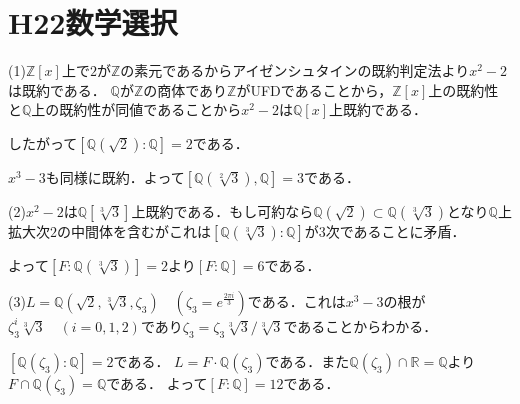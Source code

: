 \documentclass[
		book,
		head_space=20mm,
		foot_space=20mm,
		gutter=10mm,
		line_length=190mm
]{jlreq}
\begin{document}
\section{H22数学選択}
(1)$\mathbb{Z}[x]$上で$2$が$\mathbb{Z}$の素元であるからアイゼンシュタインの既約判定法より$x^2-2$は既約である．
$\mathbb{Q}$が$\mathbb{Z}$の商体であり$\mathbb{Z}$がUFDであることから，$\mathbb{Z}[x]$上の既約性と$\mathbb{Q}$上の既約性が同値であることから$x^2-2$は$\mathbb{Q}[x]$上既約である．

したがって$[\mathbb{Q}(\sqrt{2
}):\mathbb{Q}]=2$である．

$x^3-3$も同様に既約．よって$[\mathbb{Q}(\sqrt[2]{3}),\mathbb{Q}]=3$である．

(2)$x^2-2$は$\mathbb{Q}[\sqrt[3]{3}]$上既約である．もし可約なら$\mathbb{Q}(\sqrt{2})\subset \mathbb{Q}(\sqrt[3]{3})$となり$\mathbb{Q}$上拡大次$2$の中間体を含むがこれは$[\mathbb{Q}(\sqrt[3]{3}):\mathbb{Q}]$が$3$次であることに矛盾．

よって$[F:\mathbb{Q}(\sqrt[3]{3})]=2$より$[F:\mathbb{Q}]=6$である．

(3)$L=\mathbb{Q}(\sqrt{2},\sqrt[3]{3},\zeta_3)\quad(\zeta_3=e^{\frac{2\pi i}{3}})$である．これは$x^3-3$の根が$\zeta_3^i \sqrt[3]{3}\quad(i=0,1,2)$であり$\zeta_3= \zeta_3 \sqrt[3]{3}/ \sqrt[3]{3}$であることからわかる．

$[\mathbb{Q}(\zeta_3):\mathbb{Q}]=2$である．
$L=F\cdot \mathbb{Q}(\zeta_3)$である．また$\mathbb{Q}(\zeta_3)\cap \mathbb{R}=\mathbb{Q}$より$F\cap \mathbb{Q}(\zeta_3)=\mathbb{Q}$である．
よって$[F:\mathbb{Q}]=12$である．
\end{document}
